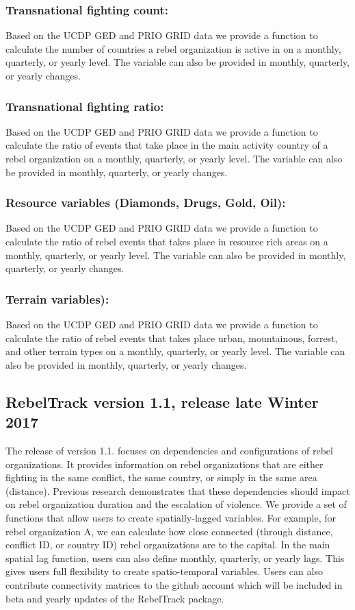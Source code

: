 \documentclass[11pt,oneside,fullpage]{amsart}
\begin{document}
\subsubsection{\textbf{Transnational fighting count:}} Based on the UCDP GED and PRIO GRID data we provide a function to calculate the number of countries a rebel organization is active in on a monthly, quarterly, or yearly level. The variable can also be provided in monthly, quarterly, or yearly changes. 
\subsubsection{\textbf{Transnational fighting ratio:}} Based on the UCDP GED and PRIO GRID data we provide a function to calculate the ratio of events that take place in the main activity country of a rebel organization on a monthly, quarterly, or yearly level. The variable can also be provided in monthly, quarterly, or yearly changes.
\subsubsection{\textbf{Resource variables (Diamonds, Drugs, Gold, Oil):}} Based on the UCDP GED and PRIO GRID data we provide a function to calculate the ratio of rebel events that takes place in resource rich areas on a monthly, quarterly, or yearly level. The variable can also be provided in monthly, quarterly, or yearly changes.
\subsubsection{\textbf{Terrain variables):}} Based on the UCDP GED and PRIO GRID  data we provide a function to calculate the ratio of rebel events that takes place urban, mountainous, forrest, and other terrain types on a monthly, quarterly, or yearly level. The variable can also be provided in monthly, quarterly, or yearly changes.





\subsection{RebelTrack version 1.1, release late Winter 2017}
The release of version 1.1. focuses on dependencies and configurations of rebel organizations. It provides information on rebel organizations that are either fighting in the same conflict, the same country, or simply in the same area (distance). Previous research demonstrates that these dependencies should impact on rebel organization duration and the escalation of violence. We provide a set of functions that allow users to create spatially-lagged variables. For example, for rebel organization A, we can calculate how close connected (through distance, conflict ID, or country ID) rebel organizations are to the capital. In the main spatial lag function, users can also define monthly, quarterly, or yearly lags. This gives users full flexibility to create spatio-temporal variables. Users can also contribute connectivity matrices to the github account which will be included in beta and yearly updates of the RebelTrack package.
\end{document}
